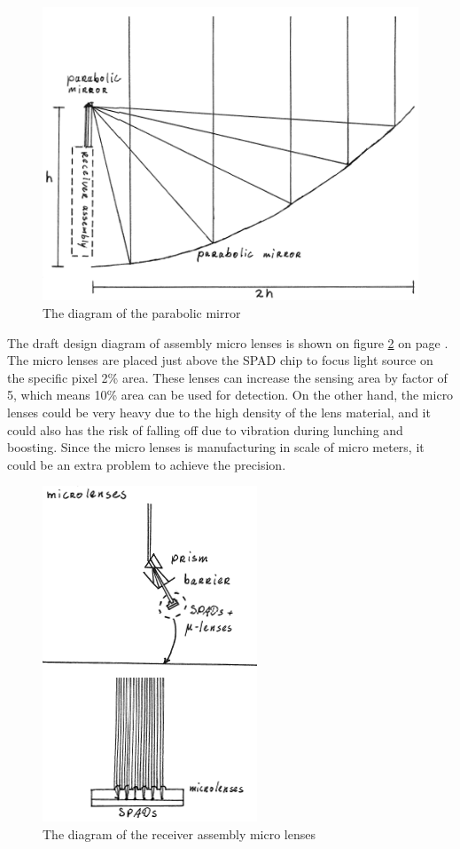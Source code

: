 \begin{figure}[ht!]
\centering
\includegraphics[scale = 0.6]{chapters/img/DiagramReceiverGeneral.png}
\caption{The diagram of the parabolic mirror}
\label{fig:diagram_Rgeneral}
\end{figure}

The draft design diagram of assembly micro lenses is shown on figure \ref{fig:diagram_Rmicrolenses} on page \pageref{fig:diagram_Rmicrolenses}. The micro lenses are placed just above the \acs{SPAD} chip to focus light source on the specific pixel 2\% area. These lenses can increase the sensing area by factor of 5, which means 10\% area can be used for detection. On the other hand, the micro lenses could be very heavy due to the high density of the lens material, and it could also has the risk of falling off due to vibration during lunching and boosting. Since the micro lenses is manufacturing in scale of micro meters, it could be an extra problem to achieve the precision.

\begin{figure}[ht!]
\centering
\includegraphics[scale = 0.6]{chapters/img/DiagramReceiverAssemblyMicrolenses.png}
\caption{The diagram of the receiver assembly micro lenses}
\label{fig:diagram_Rmicrolenses}
\end{figure}


